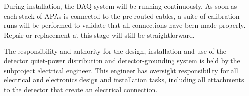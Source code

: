 During installation, the DAQ system will be running continuously.
As soon as each stack of APAs is connected to the pre-routed cables, 
a suite of calibration runs will be performed to validate that all connections have been made properly.
Repair or replacement at this stage will still be straightforward.

The responsibility and authority for the design, installation 
and use of the detector quiet-power distribution and 
detector-grounding system is held by the subproject electrical engineer. 
This engineer has oversight responsibility for all electrical and electronics 
design and installation tasks, including all attachments to the detector 
that create an electrical connection. 

%

